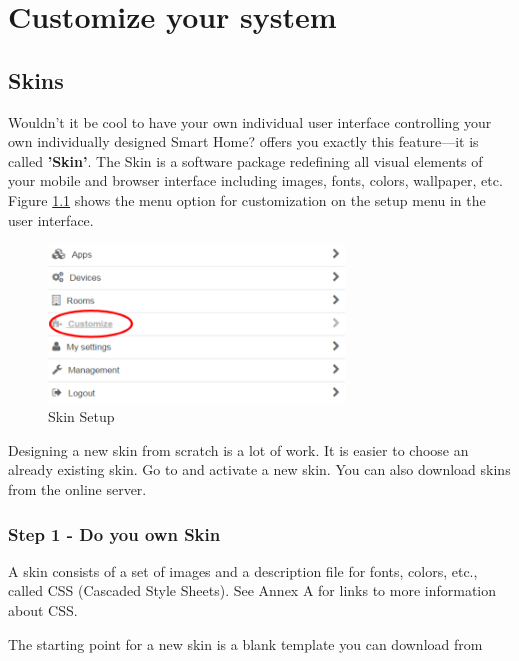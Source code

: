 \chapter{Customize your system}

\section{Skins}
\label{MakeSkins}

Wouldn’t it be cool to have your own individual user interface controlling your own 
individually designed Smart Home? \zway offers you exactly this feature---it is called \textbf{'Skin'}.
The Skin is a software package redefining all visual elements of your mobile and browser 
interface including images, fonts, colors, wallpaper, etc. Figure \ref{skin1} shows the 
menu option for customization on the setup menu in the user interface.

\begin{figure}
\begin{center}
\includegraphics[width=0.7\textwidth]{pngs/cap10/skin1.png}
\caption{Skin Setup}
\label{skin1}
\end{center}
\end{figure}

Designing a new skin from scratch is a lot of work. It is easier to choose an already 
existing skin. Go to  and activate a new 
skin. You can also download skins from the online server.

\subsection{Step 1 - Do you own Skin}

A skin consists of a set of images and a description file for fonts, colors, etc., 
called CSS (Cascaded Style Sheets). See Annex A for links to more information about CSS.

The starting point for a new skin is a blank template you can download from


